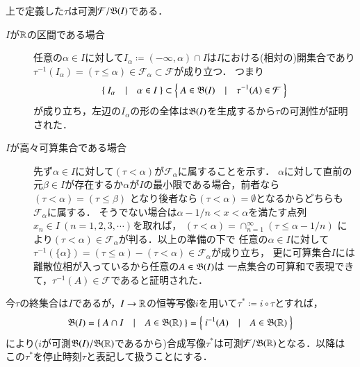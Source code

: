 	\begin{itembox}[l]{}
		\begin{rem}[停止時刻は可測]
			上で定義した$\tau$は可測$\mathcal{F}/\mathfrak{B}(I)$である．
		\end{rem}
	\end{itembox}
	\begin{prf}\mbox{}
		\begin{description}
			\item[$I$が$\mathbb{R}$の区間である場合]
				任意の$\alpha \in I$に対して$I_\alpha \coloneqq (-\infty,\alpha) \cap I$は$I$における(相対の)開集合であり
				$\tau^{-1}(I_\alpha) = (\tau \leq \alpha) \in \mathcal{F}_\alpha \subset \mathcal{F}$が成り立つ．
				つまり
				\begin{align}
					\left\{\ I_\alpha\quad |\quad \alpha \in I\ \right\} \subset \left\{\ A \in \mathfrak{B}(I)\quad |\quad \tau^{-1}(A) \in \mathcal{F}\ \right\}
					\label{eq:stopping_time_mble}
				\end{align}
				が成り立ち，左辺の$I_\alpha$の形の全体は$\mathfrak{B}(I)$を生成するから$\tau$の可測性が証明された．
				
			\item[$I$が高々可算集合である場合]
				先ず$\alpha \in I$に対して$(\tau < \alpha)$が$\mathcal{F}_\alpha$に属することを示す．
				$\alpha$に対して直前の元$\beta \in I$が存在するか$\alpha$が$I$の最小限である場合，前者なら$(\tau < \alpha) = (\tau \leq \beta)$
				となり後者なら$(\tau < \alpha) = \emptyset$となるからどちらも$\mathcal{F}_\alpha$に属する．
				そうでない場合は$\alpha - 1/n < x < \alpha$を満たす点列$x_n \in I\ (n=1,2,3,\cdots)$を取れば，
				$(\tau < \alpha) = \cap_{n=1}^{\infty}(\tau \leq \alpha - 1/n)$
				により$(\tau < \alpha) \in \mathcal{F}_\alpha$が判る．以上の準備の下で
				任意の$\alpha \in I$に対して$\tau^{-1}(\{\alpha\}) = (\tau \leq \alpha) - (\tau < \alpha) \in \mathcal{F}_\alpha$が成り立ち，
				更に可算集合$I$には離散位相が入っているから任意の$A \in \mathfrak{B}(I)$は
				一点集合の可算和で表現できて，$\tau^{-1}(A) \in \mathcal{F}$であると証明された．		
		\end{description}
		\QED
	\end{prf}
	
	\begin{itembox}[l]{}
		\begin{dfn}[停止時刻の再定義]
			今$\tau$の終集合は$I$であるが，$I \rightarrow \mathbb{R}$の恒等写像$i$を用いて$\tau^* \coloneqq i \circ \tau$とすれば，
			\begin{align}
				\borel{I}=\left\{\ A \cap I\quad |\quad A \in \borel{\R}\ \right\} = \left\{\ i^{-1}(A)\quad |\quad A \in \borel{\R}\ \right\}
			\end{align}
			により($i$が可測$\mathfrak{B}(I)/\mathfrak{B}(\mathbb{R})$であるから)合成写像$\tau^*$は可測$\mathcal{F}/\mathfrak{B}(\mathbb{R})$となる．以降は
			この$\tau^*$を停止時刻$\tau$と表記して扱うことにする．
		\end{dfn}
	\end{itembox}
	
